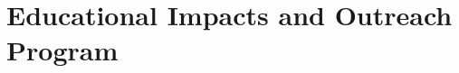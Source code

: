 \documentclass[11pt]{article}
\begin{document}
\vspace*{-7pt}
\section{Educational Impacts and Outreach Program}
\label{sec:Educational_plans}
\vspace*{-7pt}
\end{document}
